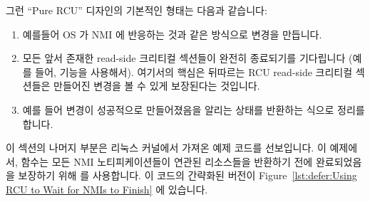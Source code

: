 그런 ``Pure RCU'' 디자인의 기본적인 형태는 다음과 같습니다:

\begin{enumerate}
\item	예를들어 OS 가 NMI 에 반응하는 것과 같은 방식으로 변경을 만듭니다.
\item	모든 앞서 존재한 read-side 크리티컬 섹션들이 완전히 종료되기를
	기다립니다 (예를 들어,  기능을 사용해서).
	여기서의 핵심은 뒤따르는 RCU read-side 크리티컬 섹션들은 만들어진
	변경을 볼 수 있게 보장된다는 것입니다.
\item	예를 들어 변경이 성공적으로 만들어졌음을 알리는 상태를 반환하는 식으로
	정리를 합니다.

\end{enumerate}

이 섹션의 나머지 부분은 리눅스 커널에서 가져온 예제 코드를 선보입니다.
이 예제에서,  함수는 모든 NMI 노티피케이션들이 연관된 리소스들을
반환하기 전에 완료되었음을 보장하기 위해  를
사용합니다.
이 코드의 간략화된 버전이
Figure~\ref{lst:defer:Using RCU to Wait for NMIs to Finish} 에 있습니다.


